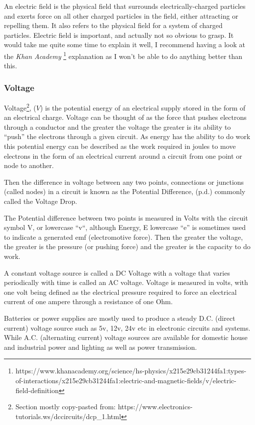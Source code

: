 An electric field is the physical field that surrounds electrically-charged particles and exerts force on all other charged particles in the field, either attracting or repelling them. It also refers to the physical field for a system of charged particles. Electric field is important, and actually not so obvious to grasp. It would take me quite some time to explain it well, I recommend having a look at the \textit{Khan Academy} \footnote{https://www.khanacademy.org/science/hs-physics/x215e29cb31244fa1:types-of-interactions/x215e29cb31244fa1:electric-and-magnetic-fields/v/electric-field-definition} explanation as I won't be able to do anything better than this. 

\subsubsection{Voltage}

Voltage\footnote{Section mostly copy-pasted from: https://www.electronics-tutorials.ws/dccircuits/dcp\_1.html}, ($V$) is the potential energy of an electrical supply stored in the form of an electrical charge. Voltage can be thought of as the force that pushes electrons through a conductor and the greater the voltage the greater is its ability to “push” the electrons through a given circuit. As energy has the ability to do work this potential energy can be described as the work required in joules to move electrons in the form of an electrical current around a circuit from one point or node to another.

Then the difference in voltage between any two points, connections or junctions (called nodes) in a circuit is known as the Potential Difference, (p.d.) commonly called the Voltage Drop.

The Potential difference between two points is measured in Volts with the circuit symbol V, or lowercase “v“, although Energy, E lowercase “e” is sometimes used to indicate a generated emf (electromotive force). Then the greater the voltage, the greater is the pressure (or pushing force) and the greater is the capacity to do work.

A constant voltage source is called a DC Voltage with a voltage that varies periodically with time is called an AC voltage. Voltage is measured in volts, with one volt being defined as the electrical pressure required to force an electrical current of one ampere through a resistance of one Ohm. 

Batteries or power supplies are mostly used to produce a steady D.C. (direct current) voltage source such as 5v, 12v, 24v etc in electronic circuits and systems. While A.C. (alternating current) voltage sources are available for domestic house and industrial power and lighting as well as power transmission.

